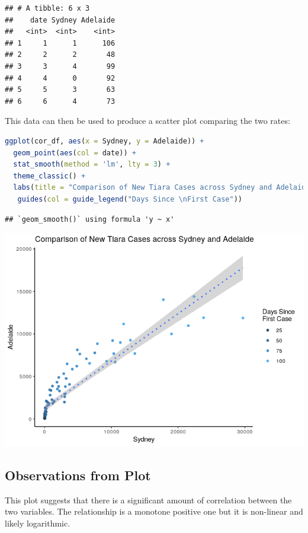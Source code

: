 \documentclass{article}
\begin{document}
\begin{lstlisting}
## # A tibble: 6 x 3
##    date Sydney Adelaide
##   <int>  <int>    <int>
## 1     1      1      106
## 2     2      2       48
## 3     3      4       99
## 4     4      0       92
## 5     5      3       63
## 6     6      4       73
\end{lstlisting}

This data can then be used to produce a scatter plot comparing the two
rates:

\begin{lstlisting}[language=R]
ggplot(cor_df, aes(x = Sydney, y = Adelaide)) +
  geom_point(aes(col = date)) +
  stat_smooth(method = 'lm', lty = 3) +
  theme_classic() +
  labs(title = "Comparison of New Tiara Cases across Sydney and Adelaide") +
   guides(col = guide_legend("Days Since \nFirst Case"))
\end{lstlisting}

\begin{lstlisting}
## `geom_smooth()` using formula 'y ~ x'
\end{lstlisting}

\includegraphics{main_files/figure-html/unnamed-chunk-13-1.png}

\hypertarget{observations-from-plot-2}{%
\subsection{Observations from Plot}\label{observations-from-plot-2}}

This plot suggests that there is a significant amount of correlation
between the two variables. The relationship is a monotone positive one
but it is non-linear and likely logarithmic.
\end{document}
